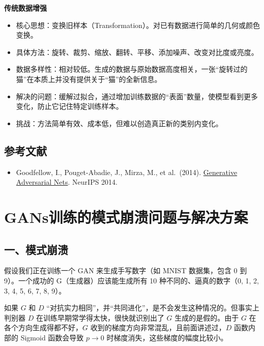 \textbf{传统数据增强}

\begin{itemize}
\tightlist
\item
  核心思想：变换旧样本（Transformation）。对已有数据进行简单的几何或颜色变换。
\item
  具体方法：旋转、裁剪、缩放、翻转、平移、添加噪声、改变对比度或亮度。
\item
  数据多样性：相对较低。生成的数据与原始数据高度相关，一张``旋转过的猫''在本质上并没有提供关于``猫''的全新信息。
\item
  解决的问题：缓解过拟合，通过增加训练数据的``表面''数量，使模型看到更多变化，防止它记住特定训练样本。
\item
  挑战：方法简单有效、成本低，但难以创造真正新的类别内变化。
\end{itemize}

\hypertarget{ux53c2ux8003ux6587ux732e-36}{%
\subsection{参考文献}\label{ux53c2ux8003ux6587ux732e-36}}

\begin{itemize}
\tightlist
\item
  Goodfellow, I., Pouget-Abadie, J., Mirza, M., et al.~(2014). \href{https://papers.nips.cc/paper/5423-generative-adversarial-nets}{Generative Adversarial Nets}. NeurIPS 2014.
\end{itemize}

\clearpage

\hypertarget{gansux8badux7ec3ux7684ux6a21ux5f0fux5d29ux6e83ux95eeux9898ux4e0eux89e3ux51b3ux65b9ux6848}{%
\section{GANs训练的模式崩溃问题与解决方案}\label{gansux8badux7ec3ux7684ux6a21ux5f0fux5d29ux6e83ux95eeux9898ux4e0eux89e3ux51b3ux65b9ux6848}}

\hypertarget{ux4e00ux6a21ux5f0fux5d29ux6e83}{%
\subsection{一、模式崩溃}\label{ux4e00ux6a21ux5f0fux5d29ux6e83}}

假设我们正在训练一个 GAN 来生成手写数字（如 MNIST 数据集，包含 0 到 9）。一个成功的 G（生成器）应该能生成所有 10 种不同的、逼真的数字（0, 1, 2, 3, 4, 5, 6, 7, 8, 9）。

如果 \(G\) 和 \(D\) ``对抗实力相同''，并``共同进化''，是不会发生这种情况的。但事实上判别器 \(D\) 在训练早期常学得太快，很快就识别出了 \(G\) 生成的是假的。由于 \(G\) 在各个方向生成得都不好，\(G\) 收到的梯度方向非常混乱，且前面讲述过，\(D\) 函数内部的 Sigmoid 函数会导致 \(p \to 0\) 时梯度消失，这些梯度的幅度比较小。

